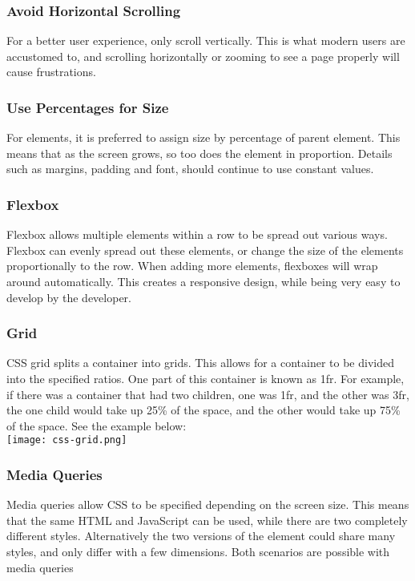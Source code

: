 \documentclass[portfolio.tex.tex]{subfiles}
\begin{document}
				\subsubsection{Avoid Horizontal Scrolling}
					For a better user experience, only scroll vertically. This is what modern users are accustomed to, and scrolling horizontally or zooming to see a page properly will cause frustrations. \autocite{google-responsive}\\

				\subsubsection{Use Percentages for Size}
					For elements, it is preferred to assign size by percentage of parent element. This means that as the screen grows, so too does the element in proportion. Details such as margins, padding and font, should continue to use constant values.\\

				\subsubsection{Flexbox}
					Flexbox allows multiple elements within a row to be spread out various ways. Flexbox can evenly spread out these elements, or change the size of the elements proportionally to the row. When adding more elements, flexboxes will wrap around automatically. This creates a responsive design, while being very easy to develop by the developer. \\

				\subsubsection{Grid}
					CSS grid splits a container into grids. This allows for a container to be divided into the specified ratios. One part of this container is known as 1fr.  For example, if there was a container that had two children, one was 1fr, and the other was 3fr, the one child would take up 25\% of the space, and the other would take up 75\% of the space. See the example below:\\

					\texttt{[image: css-grid.png]}

				\subsubsection{Media Queries}
					Media queries allow CSS to be specified depending on the screen size. This means that the same HTML and JavaScript can be used, while there are two completely different styles. Alternatively the two versions of the element could share many styles, and only differ with a few dimensions. Both scenarios are possible with media queries\\
\end{document}
